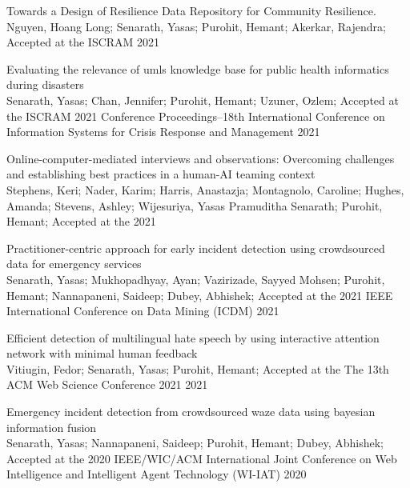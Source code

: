 \begin{rSubsection}{ Towards a Design of Resilience Data Repository for Community Resilience. }{\\ Nguyen, Hoang Long; Senarath, Yasas; Purohit, Hemant; Akerkar, Rajendra; }{Accepted at the ISCRAM}{ 2021 }
\end{rSubsection}

\begin{rSubsection}{ Evaluating the relevance of umls knowledge base for public health informatics during disasters }{\\ Senarath, Yasas; Chan, Jennifer; Purohit, Hemant; Uzuner, Ozlem; }{Accepted at the ISCRAM 2021 Conference Proceedings–18th International Conference on Information Systems for Crisis Response and Management}{ 2021 }
\end{rSubsection}

\begin{rSubsection}{ Online-computer-mediated interviews and observations: Overcoming challenges and establishing best practices in a human-AI teaming context }{\\ Stephens, Keri; Nader, Karim; Harris, Anastazja; Montagnolo, Caroline; Hughes, Amanda; Stevens, Ashley; Wijesuriya, Yasas Pramuditha Senarath; Purohit, Hemant; }{Accepted at the }{ 2021 }
\end{rSubsection}

\begin{rSubsection}{ Practitioner-centric approach for early incident detection using crowdsourced data for emergency services }{\\ Senarath, Yasas; Mukhopadhyay, Ayan; Vazirizade, Sayyed Mohsen; Purohit, Hemant; Nannapaneni, Saideep; Dubey, Abhishek; }{Accepted at the 2021 IEEE International Conference on Data Mining (ICDM)}{ 2021 }
\end{rSubsection}

\begin{rSubsection}{ Efficient detection of multilingual hate speech by using interactive attention network with minimal human feedback }{\\ Vitiugin, Fedor; Senarath, Yasas; Purohit, Hemant; }{Accepted at the The 13th ACM Web Science Conference 2021}{ 2021 }
\end{rSubsection}

\begin{rSubsection}{ Emergency incident detection from crowdsourced waze data using bayesian information fusion }{\\ Senarath, Yasas; Nannapaneni, Saideep; Purohit, Hemant; Dubey, Abhishek; }{Accepted at the 2020 IEEE/WIC/ACM International Joint Conference on Web Intelligence and Intelligent Agent Technology (WI-IAT)}{ 2020 }
\end{rSubsection}

